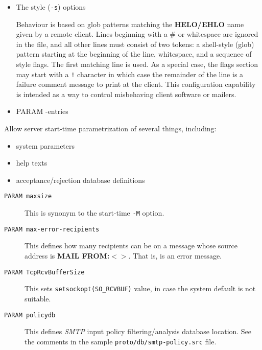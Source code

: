\begin{itemize}
\item The style ({\tt -s}) options

Behaviour is based on glob patterns matching the {\bf HELO/EHLO} name given by 
a remote client. Lines beginning with a \# or whitespace are ignored in the file, 
and all other lines must consist of two tokens: a shell-style (glob) pattern starting 
at the beginning of the line, whitespace, and a sequence of style flags. The first 
matching line is used. As a special case, the flags section may start with a {\tt !} 
character in which case the remainder of the line is a failure comment message to 
print at the client. This configuration capability is intended as a way to control 
misbehaving client software or mailers.
\end{itemize}


\begin{itemize}
\item PARAM -entries
\end{itemize}


Allow server start-time parametrization of several things, including:

\begin{itemize}
\item  system parameters
\item  help texts
\item  acceptance/rejection database definitions
\end{itemize}


\begin{description}
\item[{\tt PARAM maxsize}] \mbox{}

This is synonym to the start-time {\tt -M} option.

\item[{\tt PARAM max-error-recipients}] \mbox{}

This defines how many recipients can be on a 
message whose source address is {\bf MAIL FROM:{\(<\)}{\(>\)}}. That is, is an error message.

\item[{\tt PARAM TcpRcvBufferSize}] \mbox{}

This sets {\tt setsockopt(SO\_RCVBUF)} value, 
in case the system default is not suitable.

\item[{\tt PARAM policydb}] \mbox{}

This defines {\em SMTP\/} input policy filtering/analysis 
database location. See the comments in the sample {\tt proto/db/smtp-policy.src} file.

\end{description}



